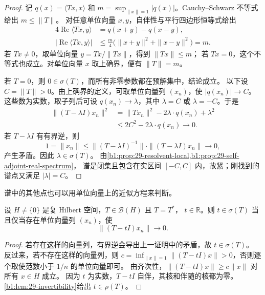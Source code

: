 \begin{proof}
记 \(q(x)=\langle Tx,x\rangle\) 和
\(m=\sup_{\|x\|=1}|q(x)|\)。Cauchy--Schwarz 不等式给出 \(m\leq\|T\|\)。
对任意单位向量 \(x,y\)，自伴性与平行四边形恒等式给出
\[
 \begin{aligned}
 4\operatorname{Re}\langle Tx,y\rangle&=q(x+y)-q(x-y),\\
 |\operatorname{Re}\langle Tx,y\rangle|
 &\leq\frac m4\bigl(\|x+y\|^2+\|x-y\|^2\bigr)=m.
 \end{aligned}
\]
若 \(Tx\ne0\)，取单位向量 \(y=Tx/\|Tx\|\)，得到 \(\|Tx\|\leq m\)；
若 \(Tx=0\)，这个不等式也成立。对单位向量 \(x\) 取上确界，便有 \(\|T\|=m\)。

若 \(T=0\)，则 \(0\in\sigma(T)\)，而所有非零参数都在预解集中，结论成立。
以下设 \(C=\|T\|>0\)。由上确界的定义，可取单位向量列 \((x_n)\)，使
\(|q(x_n)|\to C\)。这些数为实数，取子列后可设
\(q(x_n)\to\lambda\)，其中 \(\lambda=C\) 或 \(\lambda=-C\)。于是
\[
 \begin{aligned}
 \|(T-\lambda I)x_n\|^2
 &=\|Tx_n\|^2-2\lambda\cdot q(x_n)+\lambda^2\\
 &\leq2C^2-2\lambda\cdot q(x_n)\longrightarrow0.
 \end{aligned}
\]
若 \(T-\lambda I\) 有有界逆，则
\[
 1=\|x_n\|\leq\|(T-\lambda I)^{-1}\|\cdot\|(T-\lambda I)x_n\|
 \longrightarrow0,
\]
产生矛盾。因此 \(\lambda\in\sigma(T)\)。
由\cref{b1:prop:29-resolvent-local,b1:prop:29-self-adjoint-real-spectrum}，
谱是闭集且包含在实区间 \([-C,C]\) 内，故紧；刚找到的谱点又满足 \(|\lambda|=C\)。
\end{proof}

谱中的其他点也可以用单位向量上的近似方程来判断。

\begin{corollary}[近似特征向量判别]
\label{b1:cor:29-approximate-eigenvectors}
设 \(H\ne\{0\}\) 是复 Hilbert 空间，\(T\in\mathcal B(H)\) 且 \(T=T^*\)，
\(t\in\mathbb R\)。则 \(t\in\sigma(T)\) 当且仅当存在单位向量列 \((x_n)\)，使
\[
 \|(T-tI)x_n\|\longrightarrow0.
\]
\end{corollary}

\begin{proof}
若存在这样的向量列，有界逆会导出上一证明中的矛盾，故 \(t\in\sigma(T)\)。
反过来，若不存在这样的向量列，则
\(c=\inf_{\|x\|=1}\|(T-tI)x\|>0\)，否则逐个取使范数小于 \(1/n\) 的单位向量即可。
由齐次性，\(\|(T-tI)x\|\geq c\|x\|\) 对所有 \(x\in H\) 成立。
因为 \(t\) 为实数，\(T-tI\) 自伴，其核和伴随的核都为零。
\cref{b1:lem:29-invertibility}给出 \(t\in\rho(T)\)。
\end{proof}


